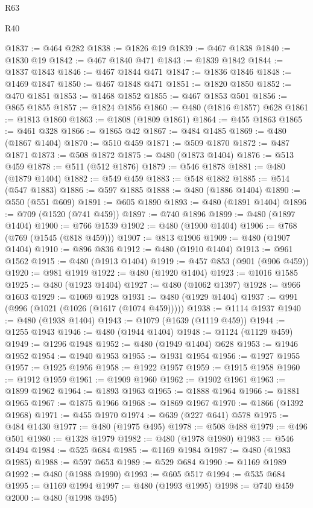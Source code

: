 \begin{lexlean}{R63}
\begin{lexlean}{R40}
\begin{coremodule}
{{{{{{{{{{{{{{{{{{{{{{{{{{{{{{{{{{{{{{{{{{{{{{{{{{{{{{{{{{{{{{{{{{{{{{{{{{{{{{{{{{{{{{{{{{{{{{{{{{{{{{{{{{{{{@1837 := @464 @282
@1838 := @1826 @19
@1839 := @467 @1838
@1840 := @1830 @19
@1842 := @467 @1840 @471
@1843 := @1839 @1842
@1844 := @1837 @1843
@1846 := @467 @1844 @471
@1847 := @1836 @1846
@1848 := @1469 @1847
@1850 := @467 @1848 @471
@1851 := @1820 @1850
@1852 := @470 @1851
@1853 := @1468 @1852
@1855 := @467 @1853 @501
@1856 := @865 @1855
@1857 := @1824 @1856
@1860 := @480 (@1816 @1857) @628
@1861 := @1813 @1860
@1863 := @1808 (@1809 @1861)
@1864 := @455 @1863
@1865 := @461 @328
@1866 := @1865 @42
@1867 := @484 @1485
@1869 := @480 (@1867 @1404)
@1870 := @510 @459
@1871 := @509 @1870
@1872 := @487 @1871
@1873 := @508 @1872
@1875 := @480 (@1873 @1404)
@1876 := @513 @459
@1878 := @511 (@512 @1876)
@1879 := @546 @1878
@1881 := @480 (@1879 @1404)
@1882 := @549 @459
@1883 := @548 @1882
@1885 := @514 (@547 @1883)
@1886 := @597 @1885
@1888 := @480 (@1886 @1404)
@1890 := @550 (@551 @609)
@1891 := @605 @1890
@1893 := @480 (@1891 @1404)
@1896 := @709 (@1520 (@741 @459))
@1897 := @740 @1896
@1899 := @480 (@1897 @1404)
@1900 := @766 @1539
@1902 := @480 (@1900 @1404)
@1906 := @768 (@769 (@1545 (@818 @459)))
@1907 := @813 @1906
@1909 := @480 (@1907 @1404)
@1910 := @896 @836
@1912 := @480 (@1910 @1404)
@1913 := @961 @1562
@1915 := @480 (@1913 @1404)
@1919 := @457 @853 (@901 (@906 @459))
@1920 := @981 @1919
@1922 := @480 (@1920 @1404)
@1923 := @1016 @1585
@1925 := @480 (@1923 @1404)
@1927 := @480 (@1062 @1397)
@1928 := @966 @1603
@1929 := @1069 @1928
@1931 := @480 (@1929 @1404)
@1937 := @991 (@996 (@1021 (@1026 (@1617 (@1074 @459)))))
@1938 := @1114 @1937
@1940 := @480 (@1938 @1404)
@1943 := @1079 (@1639 (@1119 @459))
@1944 := @1255 @1943
@1946 := @480 (@1944 @1404)
@1948 := @1124 (@1129 @459)
@1949 := @1296 @1948
@1952 := @480 (@1949 @1404) @628
@1953 := @1946 @1952
@1954 := @1940 @1953
@1955 := @1931 @1954
@1956 := @1927 @1955
@1957 := @1925 @1956
@1958 := @1922 @1957
@1959 := @1915 @1958
@1960 := @1912 @1959
@1961 := @1909 @1960
@1962 := @1902 @1961
@1963 := @1899 @1962
@1964 := @1893 @1963
@1965 := @1888 @1964
@1966 := @1881 @1965
@1967 := @1875 @1966
@1968 := @1869 @1967
@1970 := @1866 (@1392 @1968)
@1971 := @455 @1970
@1974 := @639 (@227 @641) @578
@1975 := @484 @1430
@1977 := @480 (@1975 @495)
@1978 := @508 @488
@1979 := @496 @501
@1980 := @1328 @1979
@1982 := @480 (@1978 @1980)
@1983 := @546 @1494
@1984 := @525 @684
@1985 := @1169 @1984
@1987 := @480 (@1983 @1985)
@1988 := @597 @653
@1989 := @529 @684
@1990 := @1169 @1989
@1992 := @480 (@1988 @1990)
@1993 := @605 @517
@1994 := @535 @684
@1995 := @1169 @1994
@1997 := @480 (@1993 @1995)
@1998 := @740 @459
@2000 := @480 (@1998 @495)
}}}}}}}}}}}}}}}}}}}}}}}}}}}}}}}}}}}}}}}}}}}}}}}}}}}}}}}}}}}}}}}}}}}}}}}}}}}}}}}}}}}}}}}}}}}}}}}}}}}}}}}}}}}}}
\end{coremodule}
\end{lexlean}
\end{lexlean}
